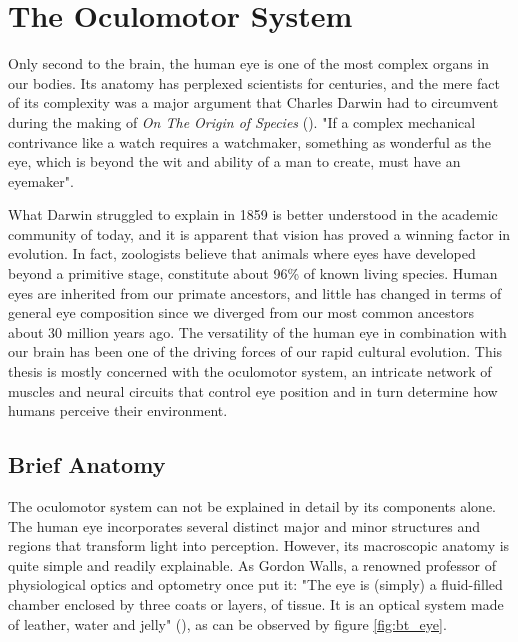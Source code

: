 \section{The Oculomotor System} \label{sec:bt_TheOculomotorSystem}

Only second to the brain, the human eye is one of the most complex organs in our bodies. Its anatomy has perplexed scientists for centuries, and the mere fact of its complexity was a major argument that Charles Darwin had to circumvent during the making of \textit{On The  Origin of Species} (\cite{oyster1999}). "If a complex mechanical contrivance like a watch requires a watchmaker, something as wonderful as the eye, which is beyond the wit and ability of a man to create, must have an eyemaker". 

What Darwin struggled to explain in 1859 is better understood in the academic community of today, and it is apparent that vision has proved a winning factor in evolution. In fact, zoologists believe that animals where eyes have developed beyond a primitive stage, constitute about 96\% of known living species. Human eyes are inherited from our primate ancestors, and little has changed in terms of general eye composition since we diverged from our most common ancestors about 30 million years ago. The versatility of the human eye in combination with our brain has been one of the driving forces of our rapid cultural evolution. This thesis is mostly concerned with the oculomotor system, an intricate network of muscles and neural circuits that control eye position and in turn determine how humans perceive their environment.

\subsection{Brief Anatomy}
The oculomotor system can not be explained in detail by its components alone. The human eye incorporates several distinct major and minor structures and regions that transform light into perception. However, its macroscopic anatomy is quite simple and readily explainable. As Gordon Walls, a renowned professor of physiological optics and optometry once put it: "The eye is (simply) a fluid-filled chamber enclosed by three coats or layers, of tissue. It is an optical system made of leather, water and jelly" (\cite{oyster1999}), as can be observed by figure \ref{fig:bt_eye}.

